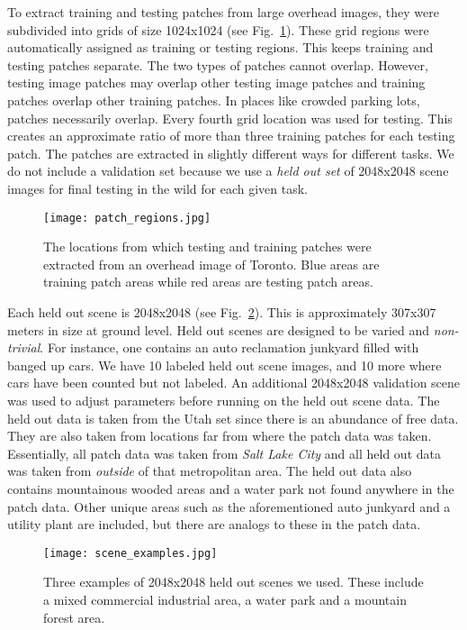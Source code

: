 \documentclass[runningheads]{llncs}
\begin{document}
To extract training and testing patches from large overhead images, they were subdivided into grids of size 1024x1024 (see Fig.~\ref{fig:patch_regions}). These grid regions were automatically assigned as training or testing regions. This keeps training and testing patches separate. The two types of patches cannot overlap. However, testing image patches may overlap other testing image patches and training patches overlap other training patches. In places like crowded parking lots, patches necessarily overlap. Every fourth grid location was used for testing. This creates an approximate ratio of more than three training patches for each testing patch. The patches are extracted in slightly different ways for different tasks. We do not include a validation set because we use a {\it held out set} of 2048x2048 scene images for final testing in the wild for each given task.  

\begin{figure}
\centering
\texttt{[image: patch\_regions.jpg]}
\caption{The locations from which testing and training patches were extracted from an overhead image of Toronto. Blue areas are training patch areas while red areas are testing patch areas. }
\label{fig:patch_regions}
\end{figure}

Each held out scene is 2048x2048 (see Fig.~\ref{fig:scenes}). This is approximately 307x307 meters in size at ground level. Held out scenes are designed to be varied and {\it non-trivial}. For instance, one contains an auto reclamation junkyard filled with banged up cars. We have 10 labeled held out scene images, and 10 more where cars have been counted but not labeled. An additional 2048x2048 validation scene was used to adjust parameters before running on the held out scene data. The held out data is taken from the Utah set since there is an abundance of free data. They are also taken from locations far from where the patch data was taken. Essentially, all patch data was taken from {\it Salt Lake City} and all held out data was taken from {\it outside} of that metropolitan area. The held out data also contains mountainous wooded areas and a water park not found anywhere in the patch data. Other unique areas such as the aforementioned auto junkyard and a utility plant are included, but there are analogs to these in the patch data. 

\begin{figure}
\centering
\texttt{[image: scene\_examples.jpg]}
\caption{Three examples of 2048x2048 held out scenes we used. These include a mixed commercial industrial area, a water park and a mountain forest area. }
\label{fig:scenes}
\end{figure}
\end{document}
